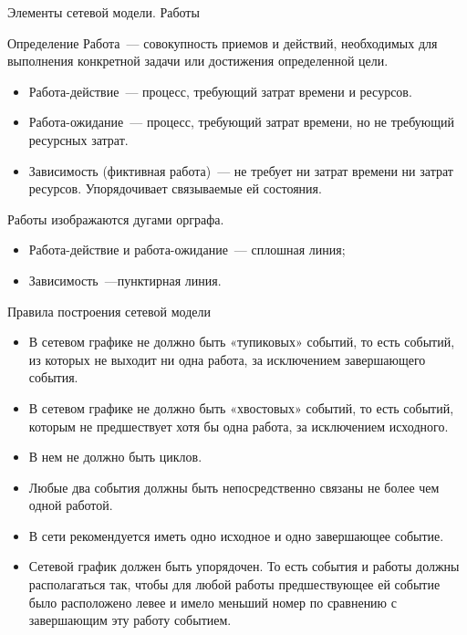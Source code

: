 \documentclass[unicode,11pt,notheorems]{beamer}
\begin{document}
\begin{frame}{Элементы сетевой модели. Работы}

\begin{block}{Определение}
	\alert{Работа}~--- совокупность приемов и действий, необходимых для выполнения конкретной задачи или достижения определенной цели. 
\end{block}
	\begin{itemize}
	\item 
		\alert{Работа-действие}~--- процесс, требующий затрат времени и ресурсов. 

	\item 
		\alert{Работа-ожидание}~--- процесс, требующий затрат времени, но не требующий ресурсных затрат. 

	\item 
		\alert{Зависимость (фиктивная работа)}~---  не требует ни затрат времени ни затрат ресурсов.
		Упорядочивает связываемые ей состояния. 
		

	\end{itemize}

	\medskip
	
	\alert{Работы} изображаются дугами орграфа.
	\begin{itemize}
	\item 
		Работа-действие и работа-ожидание~--- сплошная линия;
	\item 
		Зависимость~---пунктирная линия.
	\end{itemize}

\end{frame}

\begin{frame}{Правила построения  сетевой модели}
	\begin{itemize}
	\item
		В сетевом графике не должно быть «тупиковых» событий, то есть событий, из которых не выходит ни одна работа, за исключением завершающего события.
	\item
		В сетевом графике не должно быть «хвостовых» событий, то есть событий, которым не предшествует хотя бы одна работа, за исключением исходного.
	\item
		В нем не должно быть циклов.
	\item
		Любые два события должны быть непосредственно связаны не более чем одной работой.
	\item
		В сети рекомендуется иметь одно исходное и одно завершающее событие.
	\item
		Сетевой график должен быть упорядочен. То есть события и работы должны располагаться так, чтобы для любой работы предшествующее ей событие было расположено левее и имело меньший номер по сравнению с завершающим эту работу событием.		
	\end{itemize}
\end{frame}
\end{document}
